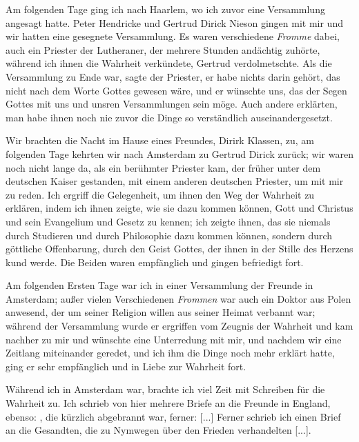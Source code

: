 Am folgenden Tage ging ich nach Haarlem, wo ich zuvor eine
Versammlung angesagt hatte. Peter Hendricke 
und Gertrud Dirick Nieson 
gingen mit mir und wir hatten eine gesegnete Versammlung. 
Es waren verschiedene \textit{Fromme} dabei, auch ein
Priester der Lutheraner, der mehrere 
Stunden andächtig zuhörte, 
während ich ihnen die Wahrheit verkündete, Gertrud verdolmetschte. 
Als die Versammlung zu Ende war, sagte der Priester,
er habe nichts darin gehört, das nicht nach dem Worte Gottes
gewesen wäre, und er wünschte uns, das der Segen Gottes mit
uns und unsren Versammlungen sein möge. Auch andere erklärten,
man habe ihnen noch nie zuvor die Dinge so verständlich 
auseinandergesetzt.

Wir brachten die Nacht im Hause eines Freundes, Dirirk
Klassen, zu, am folgenden Tage 
kehrten wir nach Amsterdam zu
Gertrud Dirick zurück; wir waren noch nicht lange da, als ein
berühmter Priester kam, der früher unter dem deutschen Kaiser
gestanden, mit einem anderen deutschen Priester, um mit mir zu
reden. Ich ergriff die Gelegenheit, um ihnen den Weg der
Wahrheit zu erklären, indem ich ihnen zeigte, wie sie dazu kommen
können, Gott und Christus und sein Evangelium und Gesetz zu
kennen; ich zeigte ihnen, das sie niemals durch Studieren und
durch Philosophie dazu kommen können, sondern durch göttliche
Offenbarung, durch den Geist Gottes, der ihnen in der Stille des
Herzens kund werde. Die Beiden waren empfänglich und gingen
befriedigt fort.

Am folgenden Ersten Tage war ich in einer Versammlung
der Freunde in Amsterdam; außer vielen Verschiedenen \textit{Frommen}
war auch ein Doktor aus Polen anwesend, der um seiner Religion
willen aus seiner Heimat verbannt war; während der 
Versammlung wurde er ergriffen vom Zeugnis der Wahrheit und kam
nachher zu mir und wünschte eine Unterredung mit mir, und
nachdem wir eine Zeitlang miteinander geredet, und ich ihm die
Dinge noch mehr erklärt hatte, ging er sehr empfänglich und in
Liebe zur Wahrheit fort.

Während ich in Amsterdam war, brachte ich viel Zeit mit
Schreiben für die Wahrheit zu. Ich schrieb von hier mehrere Briefe
an die Freunde in England, ebenso: , die kürzlich abgebrannt war,
ferner: 
 [...]
Ferner schrieb ich einen Brief an die Gesandten, die zu 
Nymwegen über den Frieden verhandelten [...].

